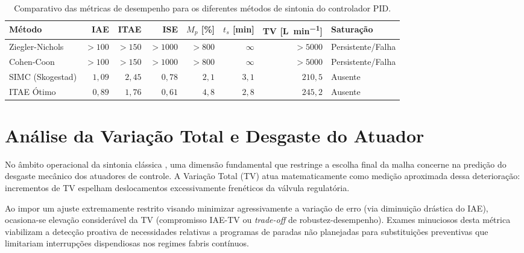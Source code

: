 \begin{table}[htbp]
    \centering
    \small
    \setlength{\tabcolsep}{4.5pt}
    \caption{Comparativo das métricas de desempenho para os diferentes métodos de sintonia do controlador PID.}
    \label{tab:metricas_desempenho}
    \begin{tabular}{@{}lrrrrrrl@{}}
        \toprule
        \textbf{Método} & \textbf{IAE} & \textbf{ITAE} & \textbf{ISE} & \textbf{$M_p$ [\%]} & \textbf{$t_s$ [\si{\minute}]} & \textbf{TV [\si{\liter\per\minute}]} & \textbf{Saturação} \\
        \midrule
        Ziegler-Nichols  & $>100$     & $>150$     & $>1000$    & $>800$   & $\infty$ & $>5000$   & Persistente/Falha \\
        Cohen-Coon       & $>100$     & $>150$     & $>1000$    & $>800$   & $\infty$ & $>5000$   & Persistente/Falha \\
        SIMC (Skogestad) & $1{,}09$   & $2{,}45$   & $0{,}78$   & $2{,}1$  & $3{,}1$  & $210{,}5$ & Ausente \\
        ITAE Ótimo       & $0{,}89$   & $1{,}76$   & $0{,}61$   & $4{,}8$  & $2{,}8$  & $245{,}2$ & Ausente \\
        \bottomrule
    \end{tabular}
\end{table}

\section{Análise da Variação Total e Desgaste do Atuador}
\label{sec:analise_tv}

No âmbito operacional da sintonia clássica \cite{Astrom2006}, uma dimensão fundamental que restringe a escolha final da malha concerne na predição do desgaste mecânico dos atuadores de controle. A Variação Total (TV) atua matematicamente como medição aproximada dessa deterioração: incrementos de TV espelham deslocamentos excessivamente frenéticos da válvula regulatória.

Ao impor um ajuste extremamente restrito visando minimizar agressivamente a variação de erro (via diminuição drástica do IAE), ocasiona-se elevação considerável da TV (compromisso IAE-TV ou \textit{trade-off} de robustez-desempenho). Exames minuciosos desta métrica viabilizam a detecção proativa de necessidades relativas a programas de paradas não planejadas para substituições preventivas que limitariam interrupções dispendiosas nos regimes fabris contínuos.
